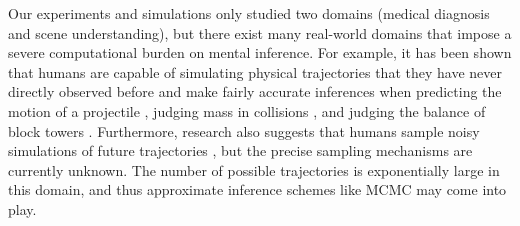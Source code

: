

Our experiments and simulations only studied two domains (medical diagnosis and scene understanding), but there exist many real-world domains that impose a severe computational burden on mental inference. For example, it has been shown that humans are capable of simulating physical trajectories that they have never directly observed before and make fairly accurate inferences when predicting the motion of a projectile \citep{motion}, judging mass in collisions \citep{collision}, and judging the balance of block towers \citep{blocks}. Furthermore, research also suggests that humans sample noisy simulations of future trajectories \citep{smith2013sources,hamrick2015think}, but the precise sampling mechanisms are currently unknown. The number of possible trajectories is exponentially large in this domain, and thus approximate inference schemes like MCMC may come into play.


